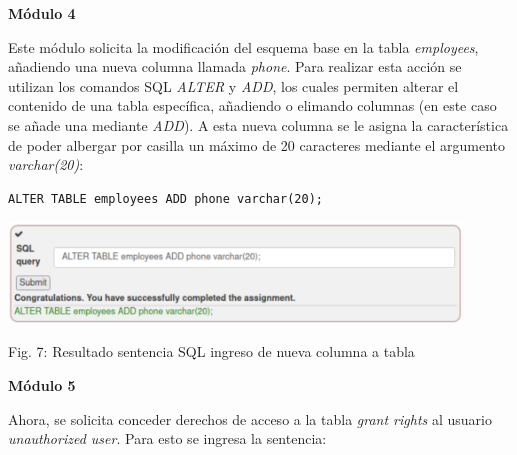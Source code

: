 \documentclass[12pt,oneside,a4paper]{book}
\begin{document}
\begin{enumerate}
\begin{enumerate}
        \textbf{Módulo 4}
        
        \vspace{1em}

        \hspace{20pt}
        Este módulo solicita la modificación del esquema base en la tabla \textit{employees}, añadiendo una nueva columna llamada \textit{phone}. Para realizar esta acción se utilizan los comandos SQL \textit{ALTER} y \textit{ADD}, los cuales permiten alterar el contenido de una tabla específica, añadiendo o elimando columnas (en este caso se añade una mediante \textit{ADD}). A esta nueva columna se le asigna la característica de poder albergar por casilla un máximo de 20 caracteres mediante el argumento \textit{varchar(20)}:

        \vspace{1em}

        \begin{verbatim}
ALTER TABLE employees ADD phone varchar(20);
        \end{verbatim}

        \newpage

        \begin{center}
            \includegraphics[width=12cm]{img/sqli4.png}
            
            \vspace{0.1em}
            
            Fig. 7: Resultado sentencia SQL ingreso de nueva columna a tabla
        \end{center}
        
        \vspace{2em}

        \textbf{Módulo 5}
        
        \vspace{1em}

        \hspace{20pt}
        Ahora, se solicita conceder derechos de acceso a la tabla \textit{grant rights} al usuario \textit{unauthorized user}. Para esto se ingresa la sentencia:


\end{enumerate}
\end{enumerate}
\end{document}
